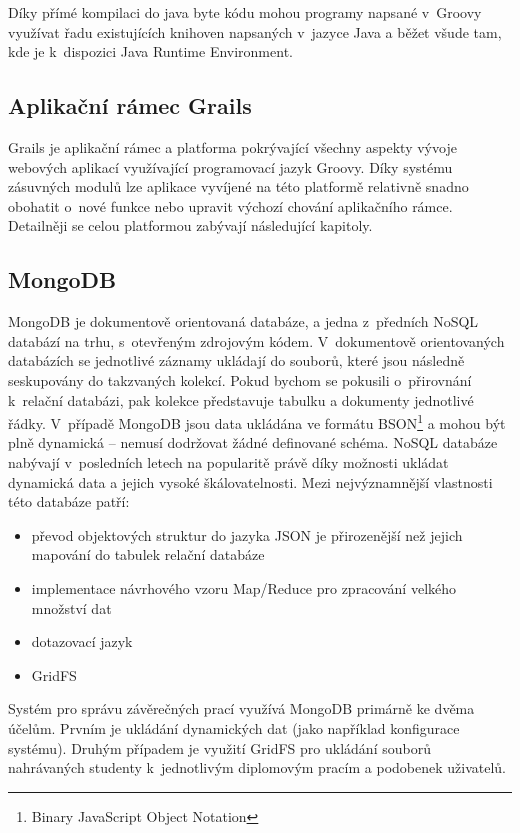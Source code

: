 Díky přímé kompilaci do java byte kódu mohou programy napsané v~Groovy využívat řadu existujících knihoven napsaných v~jazyce Java a běžet všude tam, kde je k~dispozici Java Runtime Environment\cite{groovy-in-action}.

\subsection{Aplikační rámec Grails}
Grails je aplikační rámec a platforma pokrývající všechny aspekty vývoje webových aplikací využívající programovací jazyk Groovy\cite{grails-homepage}. Díky systému zásuvných modulů lze aplikace vyvíjené na této platformě relativně snadno obohatit o~nové funkce nebo upravit výchozí chování aplikačního rámce. Detailněji se celou platformou zabývají následující kapitoly.

\subsection{MongoDB}
MongoDB je dokumentově orientovaná databáze, a jedna z~předních NoSQL databází na trhu, s~otevřeným zdrojovým kódem\cite{mongo-homepage}. V~dokumentově orientovaných databázích se jednotlivé záznamy ukládají do souborů, které jsou následně seskupovány do takzvaných kolekcí. Pokud bychom se pokusili o~přirovnání k~relační databázi, pak kolekce představuje tabulku a dokumenty jednotlivé řádky. V~případě MongoDB jsou data ukládána ve formátu BSON\footnote{Binary JavaScript Object Notation} a mohou být plně dynamická -- nemusí dodržovat žádné definované schéma. NoSQL databáze nabývají v~posledních letech na popularitě právě díky možnosti ukládat dynamická data a jejich vysoké škálovatelnosti. Mezi nejvýznamnější vlastnosti této databáze patří:

\begin{itemize}
\item převod objektových struktur do jazyka JSON je přirozenější než jejich mapování do tabulek relační databáze
\item implementace návrhového vzoru Map/Reduce pro zpracování velkého množství dat
\item dotazovací jazyk
\item GridFS
\end{itemize}

Systém pro správu závěrečných prací využívá MongoDB primárně ke dvěma účelům. Prvním je ukládání dynamických dat (jako například konfigurace systému). Druhým případem je využití GridFS pro ukládání souborů nahrávaných studenty k~jednotlivým diplomovým pracím a podobenek uživatelů.


